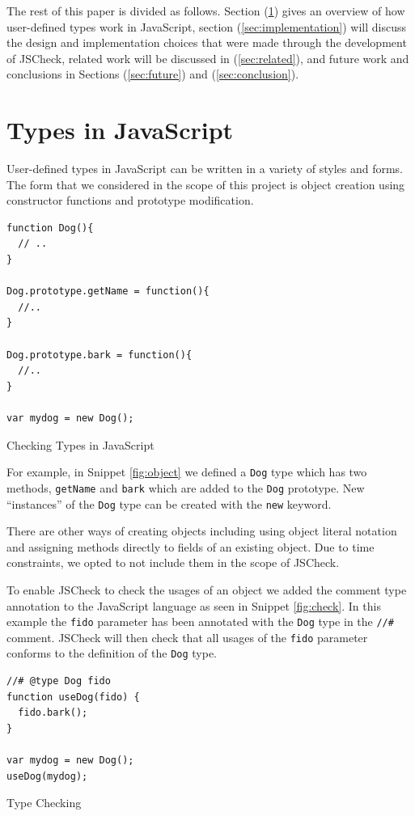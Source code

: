 \documentclass{article}
\begin{document}
The rest of this paper is divided as follows. Section (\ref{sec:types}) gives an overview
of how user-defined types work in JavaScript, section (\ref{sec:implementation}) 
will discuss the design and implementation choices that were made through the development 
of JSCheck, related work will be discussed in (\ref{sec:related}), and future work
and conclusions in Sections (\ref{sec:future}) and (\ref{sec:conclusion}).


\section{Types in JavaScript}
\label{sec:types}
User-defined types in JavaScript can be written in a variety of styles and forms. The form
that we considered in the scope of this project is object creation using 
constructor functions and prototype modification.

\begin{program}[here]
\begin{verbatim}
function Dog(){
  // ..
}

Dog.prototype.getName = function(){
  //..
}

Dog.prototype.bark = function(){
  //..
}

var mydog = new Dog();
\end{verbatim}
\caption{Checking Types in JavaScript}
\label{fig:object}
\end{program}
\pagebreak

For example, in Snippet \ref{fig:object} we defined a {\tt Dog} type
which has two methods, {\tt getName} and {\tt bark} which are added to the {\tt Dog}
prototype. New ``instances'' of the {\tt Dog} type can be created with the {\tt new}
keyword.

There are other ways of creating objects including using object literal notation
and assigning methods directly to fields of an existing object. Due to time constraints,
we opted to not include them in the scope of JSCheck.

To enable JSCheck to check the usages of an object we added the comment type annotation
to the JavaScript language as seen in Snippet \ref{fig:check}. In
this example the {\tt fido} parameter has been annotated with the {\tt Dog}
type in the {\tt //\#} comment. JSCheck will then check that all usages of
the {\tt fido} parameter conforms to the definition of the {\tt Dog} type.

\begin{program}[here]
\begin{verbatim}
//# @type Dog fido
function useDog(fido) {
  fido.bark();
}

var mydog = new Dog();
useDog(mydog);
\end{verbatim}
\caption{Type Checking}
\label{fig:check}
\end{program}
\pagebreak
\end{document}
